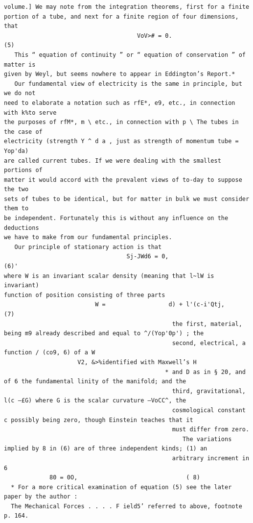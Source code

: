 \documentclass[10pt]{article}
\begin{document}
\begin{verbatim}
volume.] We may note from the integration theorems, first for a finite
portion of a tube, and next for a finite region of four dimensions, that
                                      VoV># = 0.                                    (5)
   This “ equation of continuity ” or “ equation of conservation ” of matter is
given by Weyl, but seems nowhere to appear in Eddington’s Report.*
   Our fundamental view of electricity is the same in principle, but we do not
need to elaborate a notation such as rfE*, e9, etc., in connection with k%to serve
the purposes of rfM*, m \ etc., in connection with p \ The tubes in the case of
electricity (strength Y ^ d a , just as strength of momentum tube = Yop'da)
are called current tubes. If we were dealing with the smallest portions of
matter it would accord with the prevalent views of to-day to suppose the two
sets of tubes to be identical, but for matter in bulk we must consider them to
be independent. Fortunately this is without any influence on the deductions
we have to make from our fundamental principles.
   Our principle of stationary action is that
                                   Sj-JWd6 = 0,                                     (6)'
where W is an invariant scalar density (meaning that l~lW is invariant)
function of position consisting of three parts
                          W =                  d) + l'(c-i'Qtj,                   (7)
                                                the first, material, being m9 already described and equal to ^/(Yop'0p') ; the
                                                second, electrical, a function / (co9, 6) of a W
                     V2, &>%identified with Maxwell’s H
                                              * and D as in § 20, and of 6 the fundamental linity of the manifold; and the
                                                third, gravitational, l(c —£G) where G is the scalar curvature —VoCC^, the
                                                cosmological constant c possibly being zero, though Einstein teaches that it
                                                must differ from zero.
                                                   The variations implied by 8 in (6) are of three independent kinds; (1) an
                                                arbitrary increment in 6
             80 = 0O,                               ( 8)
  * For a more critical examination of equation (5) see the later paper by the author :
  The Mechanical Forces . . . . F ield5’ referred to above, footnote p. 164.


\end{verbatim}
\end{document}
